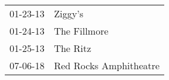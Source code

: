 \begin{supertabular}{p{0.07\textwidth}p{0.23\textwidth}}
 01-23-13 &                 Ziggy's \\
 01-24-13 &            The Fillmore \\
 01-25-13 &                The Ritz \\
 07-06-18 &  Red Rocks Amphitheatre \\
\end{supertabular}
